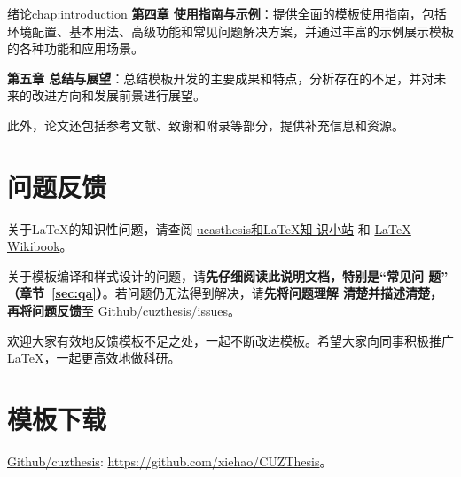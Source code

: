 \begin{cuzchapter}{绪论}{chap:introduction}
	\textbf{第四章 使用指南与示例}：提供全面的模板使用指南，包括环境配置、基本用法、高级功能和常见问题解决方案，并通过丰富的示例展示模板的各种功能和应用场景。

	\textbf{第五章 总结与展望}：总结模板开发的主要成果和特点，分析存在的不足，并对未来的改进方向和发展前景进行展望。

	此外，论文还包括参考文献、致谢和附录等部分，提供补充信息和资源。

	\section{问题反馈}\label{sec:callback}

	关于\LaTeX{}的知识性问题，请查阅
	\href{https://github.com/mohuangrui/ucasthesis/wiki}{ucasthesis和\LaTeX{}知
	识小站} 和 \href{https://en.wikibooks.org/wiki/LaTeX}{\LaTeX{} Wikibook}。

	关于模板编译和样式设计的问题，请\textbf{先仔细阅读此说明文档，特别是“常见问
		题” （章节~\ref{sec:qa}）}。若问题仍无法得到解决，请\textbf{先将问题理解
		清楚并描述清楚，再将问题反馈}至
		\href{https://github.com/xiehao/CUZThesis/issues}{Github/cuzthesis/issues}。

	欢迎大家有效地反馈模板不足之处，一起不断改进模板。希望大家向同事积极推广
	\LaTeX{}，一起更高效地做科研。

	\section{模板下载}\label{sec:download}

	\begin{center}
		\href{https://github.com/xiehao/CUZThesis}{Github/cuzthesis}:
		\url{https://github.com/xiehao/CUZThesis}。
	\end{center}

\end{cuzchapter}